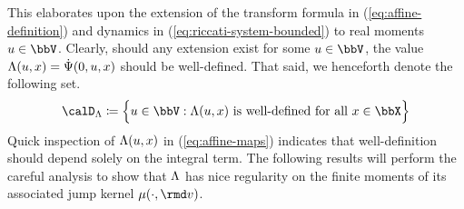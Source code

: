 This elaborates upon the extension of the transform formula in (\ref{eq:affine-definition}) and dynamics in (\ref{eq:riccati-system-bounded}) to real moments $\momentVar \in \vecSpace$. 
Clearly, should any extension exist for some $\momentVar \in \vecSpace$, the value $\Lambda(u, x) = \dot{\Psi}(0,u,x)$ should be well-defined.
That said, we henceforth denote the following set.
\begin{equation*}
  \odeSpace \defeq \Big\{ \momentVar \in \vecSpace : \ode(\momentVar, \stateVar) \text{ is well-defined for all } \stateVar \in \stateSpace \Big\}
\end{equation*}
Quick inspection of $\Lambda(u, x)$ in (\ref{eq:affine-maps}) indicates that well-definition should depend solely on the integral term.
The following results will perform the careful analysis to show that $\ode$ has nice regularity on the finite moments of its associated jump kernel $\affJump(\cdot,\rmd\markVar)$.

\iffalse












Now that we have elaborated upon the relevant results of $\ode$ as a scalar field, we proceed to show the existence of a solutions to the dynamical system it imposes.
These tighly coincide with the moments of our affine process.






Now that we have two characterizations for the space $\momentSpace$, we seek to understand properties of it and the associated moment map $\aff: \momentSpace \times \stateSpace \rightarrow \bbR$.









\fi
